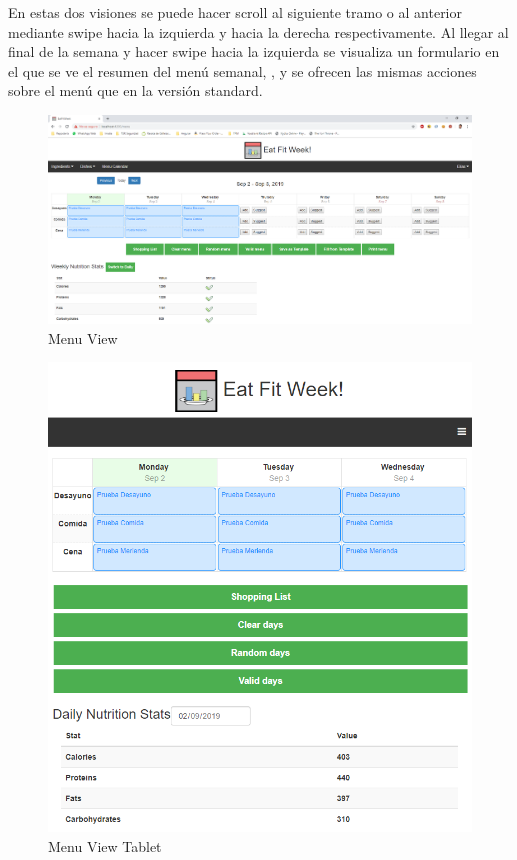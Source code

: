 \documentclass[12pt, a4paper, twoside]{book}
\begin{document}
	En estas dos visiones se puede hacer scroll al siguiente tramo o al anterior mediante swipe hacia la izquierda y hacia la derecha respectivamente. Al llegar al final de la semana y hacer swipe hacia la izquierda se visualiza un formulario en el que se ve el resumen del menú semanal, , y se ofrecen las mismas acciones sobre el menú que en la versión standard.
	\begin{figure}[H]
		\centering
		\includegraphics[width=15cm]{Imagenes/MU-MenuView.png}
		\caption{Menu View}\label{Menu View}
	\end{figure}
	\begin{figure}[H]
		\centering
		\includegraphics[width=15cm]{Imagenes/MU-MenuViewTablet.png}
		\caption{Menu View Tablet}\label{Menu View Tablet}
	\end{figure}
\end{document}
